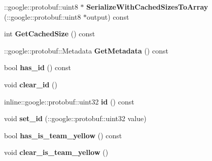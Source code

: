 \begin{DoxyCompactItemize}
\item 
\hypertarget{classvss__command_1_1Global__Commands_a124cdc7e8bf7200c9f11c801cbcaa9d4}{\-::google\-::protobuf\-::uint8 $\ast$ {\bfseries Serialize\-With\-Cached\-Sizes\-To\-Array} (\-::google\-::protobuf\-::uint8 $\ast$output) const }\label{classvss__command_1_1Global__Commands_a124cdc7e8bf7200c9f11c801cbcaa9d4}

\item 
\hypertarget{classvss__command_1_1Global__Commands_a87d23baa19f2c0272a75e15dfa234f08}{int {\bfseries Get\-Cached\-Size} () const }\label{classvss__command_1_1Global__Commands_a87d23baa19f2c0272a75e15dfa234f08}

\item 
\hypertarget{classvss__command_1_1Global__Commands_ae82e1f8fbfdf6f364c915da6d0e12f33}{\-::google\-::protobuf\-::\-Metadata {\bfseries Get\-Metadata} () const }\label{classvss__command_1_1Global__Commands_ae82e1f8fbfdf6f364c915da6d0e12f33}

\item 
\hypertarget{classvss__command_1_1Global__Commands_a70a923cca7611e0bd3c322a1ac5e91ba}{bool {\bfseries has\-\_\-id} () const }\label{classvss__command_1_1Global__Commands_a70a923cca7611e0bd3c322a1ac5e91ba}

\item 
\hypertarget{classvss__command_1_1Global__Commands_a32c51afe77b984a2be61e786893dd382}{void {\bfseries clear\-\_\-id} ()}\label{classvss__command_1_1Global__Commands_a32c51afe77b984a2be61e786893dd382}

\item 
\hypertarget{classvss__command_1_1Global__Commands_ac4b50f174ae21e1ef747b8d2498d9651}{inline\-::google\-::protobuf\-::uint32 {\bfseries id} () const }\label{classvss__command_1_1Global__Commands_ac4b50f174ae21e1ef747b8d2498d9651}

\item 
\hypertarget{classvss__command_1_1Global__Commands_aba49ba26507d3a54403584352f3dde90}{void {\bfseries set\-\_\-id} (\-::google\-::protobuf\-::uint32 value)}\label{classvss__command_1_1Global__Commands_aba49ba26507d3a54403584352f3dde90}

\item 
\hypertarget{classvss__command_1_1Global__Commands_a01e1a3bf6986a61900153eec4e51ac9b}{bool {\bfseries has\-\_\-is\-\_\-team\-\_\-yellow} () const }\label{classvss__command_1_1Global__Commands_a01e1a3bf6986a61900153eec4e51ac9b}

\item 
\hypertarget{classvss__command_1_1Global__Commands_ad626702bff23b842c6c342fb94ed9097}{void {\bfseries clear\-\_\-is\-\_\-team\-\_\-yellow} ()}\label{classvss__command_1_1Global__Commands_ad626702bff23b842c6c342fb94ed9097}


\end{DoxyCompactItemize}

